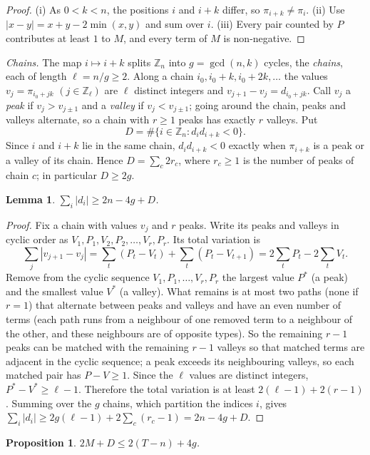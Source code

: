 \documentclass[11pt]{amsart}
\newtheorem{lemma}[theorem]{Lemma}
\newtheorem{proposition}[theorem]{Proposition}
\theoremstyle{remark}
\newcommand{\Z}{\mathbb{Z}}
\begin{document}
\begin{proof}
(i) As $0<k<n$, the positions $i$ and $i+k$ differ, so $\pi_{i+k}\ne\pi_i$. (ii) Use
$|x-y|=x+y-2\min(x,y)$ and sum over $i$. (iii) Every pair counted by $P$ contributes at least $1$ to $M$, and every
term of $M$ is non-negative.
\end{proof}

\emph{Chains.} The map $i\mapsto i+k$ splits $\Z_n$ into $g=\gcd(n,k)$ cycles, the \emph{chains}, each of length
$\ell=n/g\ge2$. Along a chain $i_0,i_0+k,i_0+2k,\dots$ the values $v_j=\pi_{i_0+jk}$ $(j\in\Z_\ell)$ are $\ell$ distinct
integers and $v_{j+1}-v_j=d_{i_0+jk}$. Call $v_j$ a \emph{peak} if $v_j>v_{j\pm1}$ and a \emph{valley} if
$v_j<v_{j\pm1}$; going around the chain, peaks and valleys alternate, so a chain with $r\ge1$ peaks has exactly $r$
valleys. Put
\[
  D=\#\{i\in\Z_n: d_id_{i+k}<0\}.
\]
Since $i$ and $i+k$ lie in the same chain, $d_id_{i+k}<0$ exactly when $\pi_{i+k}$ is a peak or a valley of its
chain. Hence $D=\sum_c 2r_c$, where $r_c\ge1$ is the number of peaks of chain $c$; in particular $D\ge 2g$.

\begin{lemma}\label{lem:tv}
$\sum_i|d_i|\ge 2n-4g+D$.
\end{lemma}

\begin{proof}
Fix a chain with values $v_j$ and $r$ peaks. Write its peaks and valleys in cyclic order as
$V_1,P_1,V_2,P_2,\dots,V_r,P_r$. Its total variation is
\[
  \sum_j|v_{j+1}-v_j|=\sum_{t}(P_t-V_t)+\sum_t(P_t-V_{t+1})=2\sum_tP_t-2\sum_tV_t .
\]
Remove from the cyclic sequence $V_1,P_1,\dots,V_r,P_r$ the largest value $P^*$ (a peak) and the smallest value
$V^*$ (a valley). What remains is at most two paths (none if $r=1$) that alternate between peaks and valleys and have an even number
of terms (each path runs from a neighbour of one removed term to a neighbour of the other, and these neighbours are
of opposite types). So the remaining $r-1$ peaks can be matched with the remaining $r-1$ valleys so that matched
terms are adjacent in the cyclic sequence; a peak exceeds its neighbouring valleys, so each matched pair has
$P-V\ge1$. Since the $\ell$ values are distinct integers, $P^*-V^*\ge \ell-1$. Therefore the total variation is at
least $2(\ell-1)+2(r-1)$. Summing over the $g$ chains, which partition the indices $i$, gives
$\sum_i|d_i|\ge 2g(\ell-1)+2\sum_c(r_c-1)=2n-4g+D$.
\end{proof}

\begin{proposition}\label{prop:key}
$2M+D\le 2(T-n)+4g$.
\end{proposition}
\end{document}
